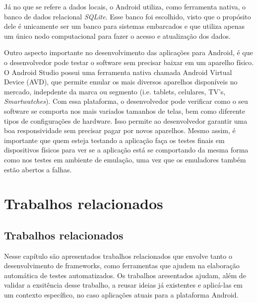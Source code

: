 \documentclass[
    12pt,       %
    openright,      %
    twoside,      %
    a4paper,      %
    english,      %
    french,       %
    spanish,      %
    brazil,       %
    ]{abntex2}
\begin{document}
        Já no que se refere a dados locais, o Android utiliza, como ferramenta nativa, o banco de
        dados relacional \textit{SQLite}. Esse banco foi escolhido, visto que o propósito dele é
        unicamente ser um banco para sistemas embarcados e que utiliza apenas um único nodo
        computacional para fazer o acesso e atualização dos dados.

        Outro aspecto importante no desenvolvimento das aplicações para Android, é que o
        desenvolvedor pode testar o software sem precisar baixar em um aparelho
        físico. O Android Studio possui uma ferramenta nativa chamada Android Virtual
        Device (AVD), que permite emular os mais diversos aparelhos disponíveis no
        mercado, indepdente da marca ou segmento (i.e. tablets, celulares, TV's,
        \textit{Smartwatches}). Com essa plataforma, o desenvolvedor pode verificar como o seu
        software se comporta nos mais variados tamanhos de telas, bem como diferente
        tipos de configurações de hardware. Isso permite ao desenvolvedor garantir
        uma boa responsividade sem precisar pagar por novos aparelhos. Mesmo assim,
        é importante que quem esteja testando a aplicação faça os testes finais em
        dispositivos físicos para ver se a aplicação está se comportando da mesma
        forma como nos testes em ambiente de emulação, uma vez que os emuladores
        também estão abertos a falhas.

  \part{Trabalhos relacionados}

  \chapter{Trabalhos relacionados}
    Nesse capítulo são apresentados trabalhos relacionados que envolve tanto o desenvolvimento de frameworks,
    como ferramentas que ajudem na elaboração automática de testes automatizados. Os trabalhos aresentados
    ajudam, além de validar a exsitência desse trabalho, a reusar ideias já existentes e aplicá-las em um
    contexto específico, no caso aplicações atuais para a plataforma Android.
\end{document}
